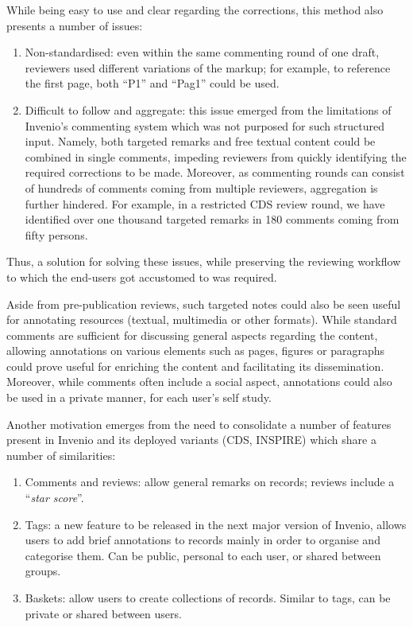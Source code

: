 While being easy to use and clear regarding the corrections, this method also
presents a number of issues:
  \begin{enumerate}
    \item Non-standardised: even within the same commenting round of one draft,
      reviewers used different variations of the markup; for example, to
      reference the first page, both ``P1'' and ``Pag1'' could be used.
    \item Difficult to follow and aggregate: this issue emerged from the
      limitations of Invenio's commenting system which was not purposed for such
      structured input. Namely, both targeted remarks and free textual content
      could be combined in single comments, impeding reviewers from quickly
      identifying the required corrections to be made. Moreover, as commenting
      rounds can consist of hundreds of comments coming from multiple reviewers,
      aggregation is further hindered. For example, in a restricted CDS review
      round, we have identified over one thousand targeted remarks in 180
      comments coming from fifty persons.
  \end{enumerate}
Thus, a solution for solving these issues, while preserving the reviewing
workflow to which the end-users got accustomed to was required.

Aside from pre-publication reviews, such targeted notes could also be seen
useful for annotating resources (textual, multimedia or other formats). While
standard comments are sufficient for discussing general aspects regarding the
content, allowing annotations on various elements such as pages, figures or
paragraphs could prove useful for enriching the content and facilitating its
dissemination. Moreover, while comments often include a social aspect,
annotations could also be used in a private manner, for each user's self study.

Another motivation emerges from the need to consolidate a number of features
present in Invenio and its deployed variants (CDS, INSPIRE) which share a number
of similarities:
\begin{enumerate}
  \item Comments and reviews: allow general remarks on records; reviews include
    a ``\textit{star score}''.
  \item Tags: a new feature to be released in the next major version of Invenio,
    allows users to add brief annotations to records mainly in order to
    organise and categorise them. Can be public, personal to each user, or
    shared between groups.
  \item Baskets: allow users to create collections of records. Similar to tags,
    can be private or shared between users.
\end{enumerate}

